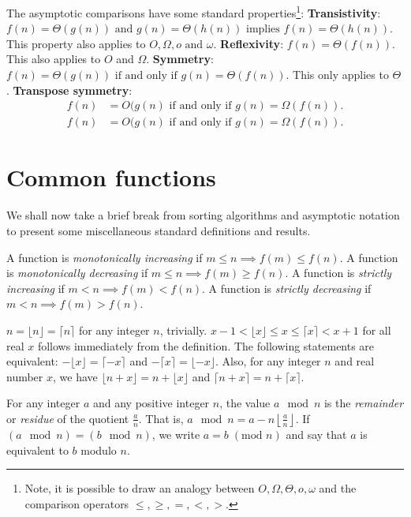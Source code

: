 \documentclass[12pt]{article}
\begin{document}
The asymptotic comparisons have some standard properties\footnote{Note, it is possible to draw an analogy between $O, \Omega, \Theta, o, \omega$ and the comparison operators
$\leq, \geq, =, <, >$.}:
\newline \textbf{Transistivity}: $f(n) = \Theta(g(n)) \text{ and } g(n) = \Theta(h(n)) \text{ implies } f(n) = \Theta(h(n))$.
This property also applies to $O, \Omega, o \text{ and }\omega$.
\newline \textbf{Reflexivity}: $f(n) = \Theta(f(n))$. This also applies to $O$ and $\Omega$.
\newline \textbf{Symmetry}: $f(n) = \Theta(g(n)) \text{ if and only if } g(n) = \Theta(f(n))$. This only applies to $\Theta$.
\newline \textbf{Transpose symmetry}:
\begin{align*}
    f(n)&= O(g(n) \text{ if and only if } g(n) = \Omega(f(n)).\\
    f(n)&= O(g(n) \text{ if and only if } g(n) = \Omega(f(n)).
\end{align*}

\section{Common functions}
We shall now take a brief break from sorting algorithms and asymptotic notation to present some miscellaneous
standard definitions and results.

A function is \textit{monotonically increasing} if $m \leq n \implies f(m) \leq f(n)$.
A function is \textit{monotonically decreasing} if $m \leq n \implies f(m) \geq f(n)$.
A function is \textit{strictly increasing} if $m < n \implies f(m) < f(n)$.
A function is \textit{strictly decreasing} if $m < n \implies f(m) > f(n)$.

$n = \lfloor n\rfloor = \lceil n\rceil$ for any integer $n$, trivially. $x - 1 < \lfloor x\rfloor \leq x
\leq \lceil x\rceil < x + 1$ for all real $x$ follows immediately from the definition. The following statements are equivalent:
$-\lfloor x \rfloor = \lceil-x\rceil$ and $-\lceil x \rceil = \lfloor-x\rfloor$. Also, for any integer
$n$ and real number $x$, we have $\lfloor n + x\rfloor = n+ \lfloor x\rfloor$ and $\lceil n + x\rceil = n+ \lceil x\rceil$.

For any integer $a$ and any positive integer $n$, the value $a\mod n$ is the \textit{remainder} or
\textit{residue} of the quotient $\frac{a}{n}$. That is, $a \mod n = a - n\left\lfloor\frac{a}{n}\right\rfloor$.
If $(a\mod n) = (b\mod n)$, we write $a = b \;(\text{mod } n)$ and say that $a$ is equivalent to $b$ modulo $n$.
\end{document}
